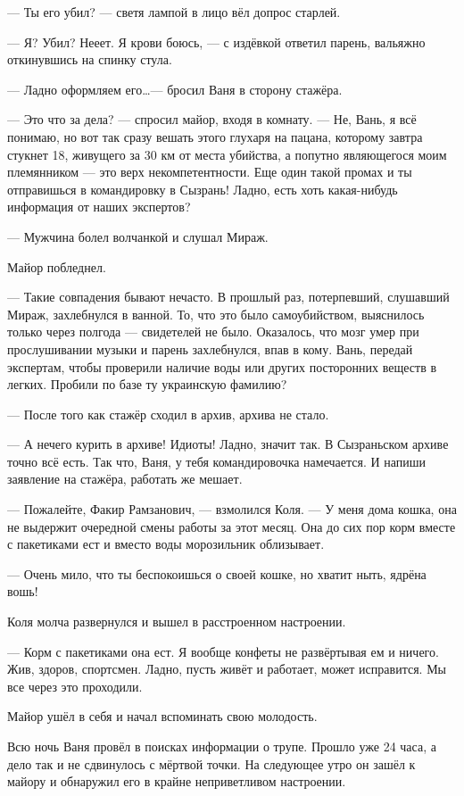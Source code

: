 --- Ты его убил? --- светя лампой в лицо вёл допрос старлей.

--- Я? Убил? Нееет. Я крови боюсь, --- с издёвкой ответил парень, вальяжно откинувшись на спинку стула.

--- Ладно оформляем его\ldots --- бросил Ваня в сторону стажёра.

--- Это что за дела? --- спросил майор, входя в комнату. --- Не, Вань, я всё понимаю, но вот так сразу вешать этого глухаря на пацана, которому завтра стукнет 18, живущего за 30 км от места убийства, а попутно являющегося моим племянником --- это верх некомпетентности. Еще один такой промах и ты отправишься в командировку в Сызрань! Ладно, есть хоть какая-нибудь информация от наших экспертов?

--- Мужчина болел волчанкой и слушал Мираж.

Майор побледнел.

--- Такие совпадения бывают нечасто. В прошлый раз, потерпевший, слушавший Мираж, захлебнулся в ванной. То, что это было самоубийством, выяснилось только через полгода --- свидетелей не было. Оказалось, что мозг умер при прослушивании музыки и парень захлебнулся, впав в кому. Вань, передай экспертам, чтобы проверили наличие воды или других посторонних веществ в легких. Пробили по базе ту украинскую фамилию?

--- После того как стажёр сходил в архив, архива не стало.

--- А нечего курить в архиве! Идиоты! Ладно, значит так. В Сызраньском архиве точно всё есть. Так что, Ваня, у тебя командировочка намечается. И напиши заявление на стажёра, работать же мешает.

--- Пожалейте, Факир Рамзанович, --- взмолился Коля. --- У меня дома кошка, она не выдержит очередной смены работы за этот месяц. Она до сих пор корм вместе с пакетиками ест и вместо воды морозильник облизывает.

--- Очень мило, что ты беспокоишься о своей кошке, но хватит ныть, ядрёна вошь!

Коля молча развернулся и вышел в расстроенном настроении.

--- Корм с пакетиками она ест. Я вообще конфеты не развёртывая ем и ничего. Жив, здоров, спортсмен. Ладно, пусть живёт и работает, может исправится. Мы все через это проходили.

Майор ушёл в себя и начал вспоминать свою молодость.

\asterisks

Всю ночь Ваня провёл в поисках информации о трупе. Прошло уже 24 часа, а дело так и не сдвинулось с мёртвой точки. На следующее утро он зашёл к майору и обнаружил его в крайне неприветливом настроении.

